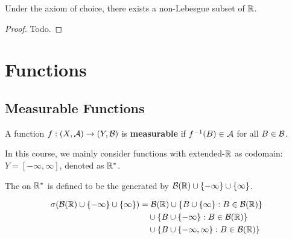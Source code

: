\documentclass[11pt]{article}
\begin{document}
	\begin{theorem}
		Under the axiom of choice, there exists a non-Lebesgue subset of $\mathbb{R}$.
	\end{theorem}
	
	\begin{proof}
		Todo.
	\end{proof}

	\section{Functions}
	\subsection{Measurable Functions}
	\begin{definition}
		A function $f: (X, \mathcal{{A}}) \to (Y, \mathcal{{B}})$ is \textbf{measurable} if $f^{-1}(B) \in \mathcal{{A}}$ for all $B \in \mathcal{{B}}$.
	\end{definition}
	In this course, we mainly consider functions with extended-$\mathbb{R}$ as codomain: $Y = [-\infty, \infty]$, denoted as $\mathbb{R}^*$.
	\begin{definition}
		The \salg on $\mathbb{R}^*$ is defined to be the \salg generated by $\mathcal{{B}}(\mathbb{R}) \cup \{-\infty\} \cup \{\infty\}$.
	\end{definition}
	
	\begin{proposition}
		\begin{align}
			\sigma(\mathcal{{B}}(\mathbb{R}) \cup \{-\infty\} \cup \{\infty\}) &= \mathcal{{B}}(\mathbb{R}) \cup \{B \cup \{\infty\}: B \in \mathcal{{B}}(\mathbb{R})\} \\
			&\quad \cup \{B \cup \{-\infty\}: B \in \mathcal{{B}}(\mathbb{R})\} \\
			&\quad \cup \{B \cup \{-\infty, \infty\}: B \in \mathcal{{B}}(\mathbb{R})\}
		\end{align}
	\end{proposition}
	
\end{document}
